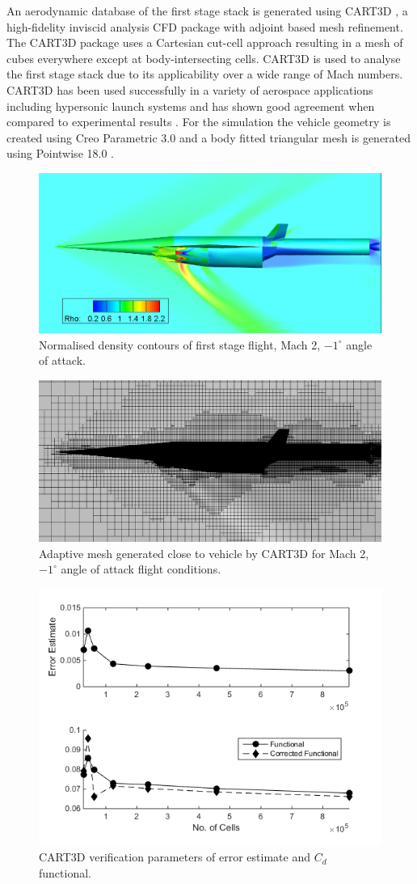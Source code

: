 \documentclass[journal]{new-aiaa}
\begin{document}
An aerodynamic database of the first stage stack is generated using CART3D \cite{CART3D}, a high-fidelity inviscid analysis CFD package with adjoint based mesh refinement. The CART3D package uses a Cartesian cut-cell approach \cite{Aftosmis1997} resulting in a mesh of cubes everywhere except at body-intersecting cells. CART3D is used to analyse the first stage stack due to its applicability over a wide range of Mach numbers. CART3D has been used successfully in a variety of aerospace applications including hypersonic launch systems \cite{Mehta2015} and has shown good agreement when compared to experimental results \cite{Aftosmis2011}.
For the simulation the vehicle geometry is created using Creo Parametric 3.0 \cite{CREO} and a body fitted triangular mesh is generated using Pointwise 18.0 \cite{Pointwise}.
\begin{figure}[ht]
	\centering
	\includegraphics[width=0.6\linewidth]{CARTcontour}
	\caption{Normalised density contours of first stage flight, Mach 2, $-1^\circ$ angle of attack.}
	\label{fig:CARTcontour}
\end{figure}
\begin{figure}[ht]
	\centering
	\includegraphics[width=0.6\linewidth]{CARTmesh}
	\caption{Adaptive mesh generated close to vehicle by CART3D for Mach 2, $-1^\circ$ angle of attack flight conditions.}
	\label{fig:CARTmesh}
\end{figure}
\begin{figure}[ht]
	\centering
	\includegraphics[width=0.4\linewidth]{CART}
	\caption{CART3D verification parameters of error estimate and $C_d$ functional.}
	\label{fig:CART}
\end{figure}
\end{document}
